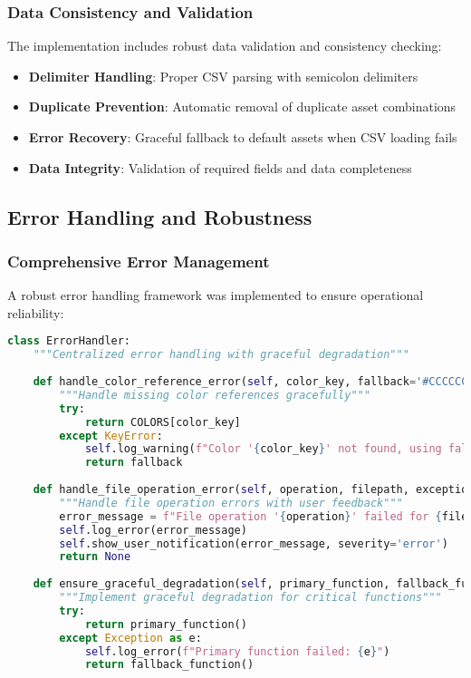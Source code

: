 \documentclass[binding=0.6cm]{sapthesis}
\begin{document}
\subsubsection{Data Consistency and Validation}

The implementation includes robust data validation and consistency checking:

\begin{itemize}
    \item \textbf{Delimiter Handling}: Proper CSV parsing with semicolon delimiters
    \item \textbf{Duplicate Prevention}: Automatic removal of duplicate asset combinations
    \item \textbf{Error Recovery}: Graceful fallback to default assets when CSV loading fails
    \item \textbf{Data Integrity}: Validation of required fields and data completeness
\end{itemize}


\subsection{Error Handling and Robustness}

\subsubsection{Comprehensive Error Management}

A robust error handling framework was implemented to ensure operational reliability:

\begin{lstlisting}[language=Python, caption=Enhanced Error Handling Framework]
class ErrorHandler:
    """Centralized error handling with graceful degradation"""
    
    def handle_color_reference_error(self, color_key, fallback='#CCCCCC'):
        """Handle missing color references gracefully"""
        try:
            return COLORS[color_key]
        except KeyError:
            self.log_warning(f"Color '{color_key}' not found, using fallback")
            return fallback
    
    def handle_file_operation_error(self, operation, filepath, exception):
        """Handle file operation errors with user feedback"""
        error_message = f"File operation '{operation}' failed for {filepath}: {exception}"
        self.log_error(error_message)
        self.show_user_notification(error_message, severity='error')
        return None
    
    def ensure_graceful_degradation(self, primary_function, fallback_function):
        """Implement graceful degradation for critical functions"""
        try:
            return primary_function()
        except Exception as e:
            self.log_error(f"Primary function failed: {e}")
            return fallback_function()
\end{lstlisting}
\end{document}
